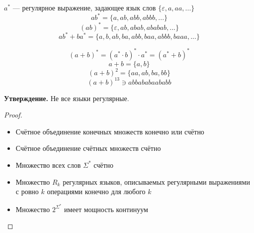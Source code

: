 \documentclass[11pt]{article}
\begin{document}
\begin{example}
    $a^*$ --- регулярное выражение, задающее язык слов $\{ \varepsilon, a, aa, ... \}$\\
    \[ ab^* = \{a, ab, abb, abbb, ... \}\]
    \[ (ab)^* =\{ \varepsilon, ab,abab,ababab, ... \} \]
    \[ ab^*+ba^* = \{a,b, ab,ba, abb, baa, abbb, baaa, ... \}\]
\end{example}

\begin{example}
    \[ (a+b)^* = (a^*\cdot b)^* \cdot a^*= (a^*+b)^*  \]
    \[ a+b = \{ a,b \} \]
    \[ (a+b)^2 = \{ aa, ab, ba, bb \} \]
    \[ (a+b)^{13} \ni abbababaababb \] 

\end{example}

\noindent\textbf{Утверждение.} Не все языки регулярные.
\begin{proof}
    \begin{itemize} 
        \item Счётное объединение конечных множеств конечно или счётно
        \item Счётное объединение счётных множеств счётно
        \item Множество всех слов $\Sigma^*$ счётно
        \item Множество $R_k$ регулярных языков, описываемых регулярными выражениями с ровно $k$
        операциями конечно для любого $k$
        \item Множество $2^{\Sigma^*}$ имеет мощность континуум
    \end{itemize}
\end{proof}
\end{document}
